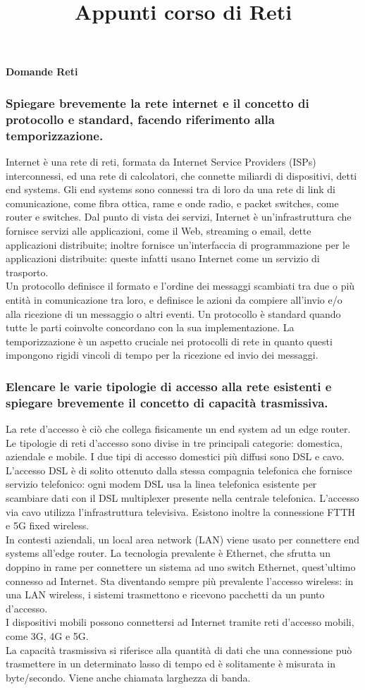 \documentclass[11pt]{article}
\title{Appunti corso di Reti}
\begin{document}
\begin{center}
    \large\textbf{Domande Reti}
\end{center}
\subsubsection*{Spiegare brevemente la rete internet e il concetto di protocollo e standard, facendo riferimento alla temporizzazione.}
Internet è una rete di reti, formata da Internet Service Providers (ISPs) interconnessi, ed una rete di calcolatori, che
connette miliardi di dispositivi, detti end systems. Gli end systems sono connessi tra di loro da una rete di link di 
comunicazione, come fibra ottica, rame e onde radio, e packet switches, come router e switches. Dal punto di vista dei 
servizi, Internet è un'infrastruttura che fornisce servizi alle applicazioni, come il Web, streaming o email, dette applicazioni 
distribuite; inoltre fornisce un'interfaccia di programmazione per le applicazioni distribuite: queste infatti usano Internet 
come un servizio di trasporto.\\
Un protocollo definisce il formato e l'ordine dei messaggi scambiati tra due o più entità in comunicazione tra loro, e definisce 
le azioni da compiere all'invio e/o alla ricezione di un messaggio o altri eventi. 
Un protocollo è standard quando tutte le parti coinvolte concordano con la sua implementazione.
La temporizzazione è un aspetto cruciale nei protocolli di rete in quanto questi impongono rigidi vincoli di tempo per 
la ricezione ed invio dei messaggi.
\subsubsection*{Elencare le varie tipologie di accesso alla rete esistenti e spiegare brevemente il concetto di capacità trasmissiva.} 
La rete d'accesso è ciò che collega fisicamente un end system ad un edge router. Le tipologie di reti d'accesso sono divise 
in tre principali categorie: domestica, aziendale e mobile.
I due tipi di accesso domestici più diffusi sono DSL e cavo. L'accesso DSL è di solito ottenuto dalla stessa compagnia 
telefonica che fornisce servizio telefonico: ogni modem DSL usa la linea telefonica esistente per scambiare dati con il 
DSL multiplexer presente nella centrale telefonica. L'accesso via cavo utilizza l'infrastruttura televisiva. Esistono inoltre 
la connessione FTTH e 5G fixed wireless.\\
In contesti aziendali, un local area network (LAN) viene usato per connettere end systems all'edge router. La tecnologia 
prevalente è Ethernet, che sfrutta un doppino in rame per connettere un sistema ad uno switch Ethernet, quest'ultimo connesso 
ad Internet. Sta diventando sempre più prevalente l'accesso wireless: in una LAN wireless, i sistemi trasmettono e ricevono 
pacchetti da un punto d'accesso.\\
I dispositivi mobili possono connettersi ad Internet tramite reti d'accesso mobili, come 3G, 4G e 5G.\\
La capacità trasmissiva si riferisce alla quantità di dati che una connessione può trasmettere in un determinato lasso di 
tempo ed è solitamente è misurata in byte/secondo. Viene anche chiamata larghezza di banda.
\end{document}
